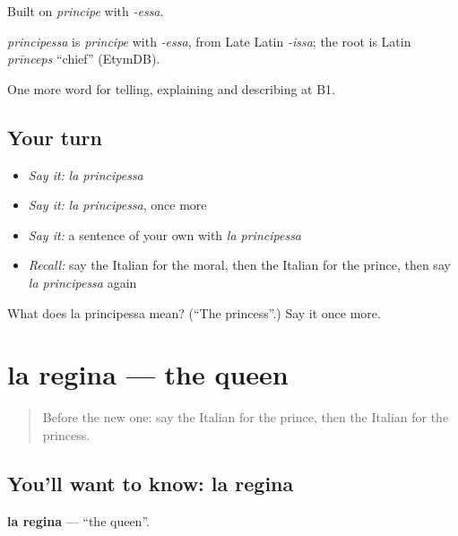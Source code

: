 Built on \emph{principe} with \emph{-essa}.

\begin{cousinweb}
\emph{principessa} is \emph{principe} with \emph{-essa}, from Late Latin \emph{-issa}; the root is Latin \emph{prīnceps} \textquotedblleft{}chief\textquotedblright{} (EtymDB).
\end{cousinweb}

\begin{grammarlens}[title={What you've built}]
One more word for telling, explaining and describing at B1.
\end{grammarlens}

\subsection*{Your turn}
\begin{itemize}
\raggedright
  \item \emph{Say it:} \emph{la principessa}
  \item \emph{Say it:} \emph{la principessa}, once more
  \item \emph{Say it:} a sentence of your own with \emph{la principessa}
  \item \emph{Recall:} say the Italian for the moral, then the Italian for the prince, then say \emph{la principessa} again
\end{itemize}

\begin{tcolorbox}[breakable,colback=teal!4,colframe=teal!35!black,title={Before you move on}]
What does la principessa mean? (\textquotedblleft{}The princess\textquotedblright{}.) Say it once more.
\end{tcolorbox}
\section[la regina]{la regina — the queen}

\label{lesson:IT-C325-regina}



\begin{quote}
Before the new one: say the Italian for the prince, then the Italian for the princess.
\end{quote}

\subsection*{You'll want to know: la regina}
\textbf{la regina} — \textquotedblleft{}the queen\textquotedblright{}.

